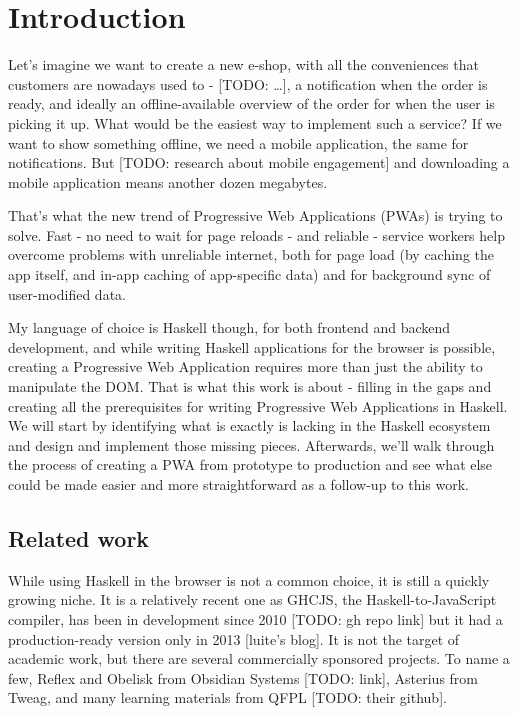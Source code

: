 \documentclass[english,odsaz]{fitthesis}
\date{\today}
\title{}
\begin{document}
\maketitle
\setlength{\parskip}{0pt}
{\hypersetup{hidelinks}\tableofcontents}
\iftotalfigures\listoffigures\fi
\iftotaltables\listoftables\fi
\iftwoside\cleardoublepage\fi
\setlength{\parskip}{0.5\bigskipamount}

\chapter{Introduction}
\label{sec:org4c4acab}
Let's imagine we want to create a new e-shop, with all the conveniences that
customers are nowadays used to - [TODO: \ldots{}], a notification when the order is
ready, and ideally an offline-available overview of the order for when the user
is picking it up. What would be the easiest way to implement such a service? If
we want to show something offline, we need a mobile application, the same for
notifications. But [TODO: research about mobile engagement] and downloading a
mobile application means another dozen megabytes.

That's what the new trend of Progressive Web Applications (PWAs) is trying to
solve. Fast - no need to wait for page reloads - and reliable - service workers help
overcome problems with unreliable internet, both for page load (by caching the
app itself, and in-app caching of app-specific data) and for background sync of
user-modified data.

My language of choice is Haskell though, for both frontend and backend
development, and while writing Haskell applications for the browser is possible,
creating a Progressive Web Application requires more than just the ability to
manipulate the DOM. That is what this work is about - filling in the gaps and
creating all the prerequisites for writing Progressive Web Applications in
Haskell. We will start by identifying what is exactly is lacking in the Haskell
ecosystem and design and implement those missing pieces. Afterwards, we'll walk
through the process of creating a PWA from prototype to production and see what
else could be made easier and more straightforward as a follow-up to this work.

\section{Related work}
\label{sec:org461cd2c}
While using Haskell in the browser is not a common choice, it is still a quickly
growing niche. It is a relatively recent one as GHCJS, the Haskell-to-JavaScript
compiler, has been in development since 2010 [TODO: gh repo link] but it had a
production-ready version only in 2013 [luite's blog]. It is not the target of
academic work, but there are several commercially sponsored projects. To name a
few, Reflex and Obelisk from Obsidian Systems [TODO: link], Asterius from Tweag,
and many learning materials from QFPL [TODO: their github].
\end{document}
